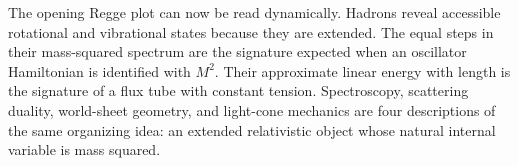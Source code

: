 The opening Regge plot can now be read dynamically. Hadrons reveal accessible
rotational and vibrational states because they are extended. The equal steps
in their mass-squared spectrum are the signature expected when an oscillator
Hamiltonian is identified with \(M^2\). Their approximate linear energy with
length is the signature of a flux tube with constant tension. Spectroscopy,
scattering duality, world-sheet geometry, and light-cone mechanics are four
descriptions of the same organizing idea: an extended relativistic object
whose natural internal variable is mass squared.
